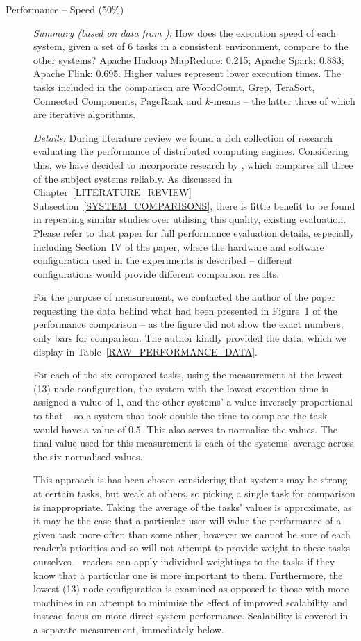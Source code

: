   \begin{description}
    \item[Performance -- Speed (50\%)]
      \textit{Summary (based on data from \citeauthor{VEIGA:EVALUATION:2015} \cite{VEIGA:EVALUATION:2015}):} How does the execution speed of each system, given a set of 6 tasks in a consistent environment, compare to the other systems? Apache Hadoop MapReduce: 0.215; Apache Spark: 0.883; Apache Flink: 0.695. Higher values represent lower execution times. The tasks included in the comparison are WordCount, Grep, TeraSort, Connected Components, PageRank and $k$-means -- the latter three of which are iterative algorithms. \medskip

      \textit{Details:} During literature review we found a rich collection of research evaluating the performance of distributed computing engines. Considering this, we have decided to incorporate research by \citeauthor{VEIGA:EVALUATION:2015} \cite{VEIGA:EVALUATION:2015}, which compares all three of the subject systems reliably. As discussed in Chapter~\ref{LITERATURE_REVIEW} Subsection~\ref{SYSTEM_COMPARISONS}, there is little benefit to be found in repeating similar studies over utilising this quality, existing evaluation. Please refer to that paper for full performance evaluation details, especially including Section~IV of the paper, where the hardware and software configuration used in the experiments is described -- different configurations would provide different comparison results.

      For the purpose of measurement, we contacted the author of the paper requesting the data behind what had been presented in Figure~1 of the performance comparison -- as the figure did not show the exact numbers, only bars for comparison. The author kindly provided the data, which we display in Table~\ref{RAW_PERFORMANCE_DATA}.

      For each of the six compared tasks, using the measurement at the lowest (13) node configuration, the system with the lowest execution time is assigned a value of 1, and the other systems' a value inversely proportional to that -- so a system that took double the time to complete the task would have a value of 0.5. This also serves to normalise the values. The final value used for this measurement is each of the systems' average across the six normalised values.

      This approach is has been chosen considering that systems may be strong at certain tasks, but weak at others, so picking a single task for comparison is inappropriate. Taking the average of the tasks' values is approximate, as it may be the case that a particular user will value the performance of a given task more often than some other, however we cannot be sure of each reader's priorities and so will not attempt to provide weight to these tasks ourselves -- readers can apply individual weightings to the tasks if they know that a particular one is more important to them. Furthermore, the lowest (13) node configuration is examined as opposed to those with more machines in an attempt to minimise the effect of improved scalability and instead focus on more direct system performance. Scalability is covered in a separate measurement, immediately below.


\end{description}
